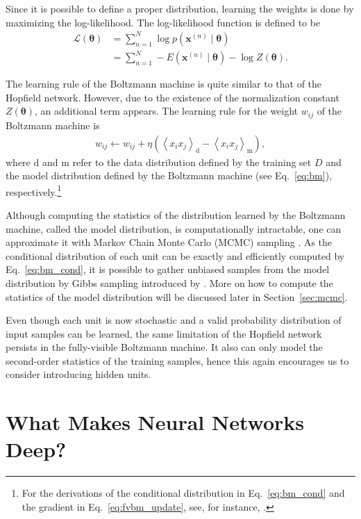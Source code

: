 \documentclass[dissertation,nocontribution]{aaltoseries}
\newcommand{\vect}[1]{\mathbf{#1}}
\newcommand{\vects}[1]{\boldsymbol{#1}}
\newcommand{\vx}[0]{\vect{x}}
\newcommand{\td}[0]{\text{d}}
\newcommand{\tf}[0]{\text{m}}
\newcommand{\TT}[0]{{\vects{\theta}}}
\newcommand{\LL}[0]{\mathcal{L}}
\begin{document}
Since it is possible to define a proper distribution,
learning the weights is done by maximizing the
log-likelihood. The log-likelihood function is defined to be
\begin{align}
    \label{eq:fvbm_ll}
    \LL(\TT) &= \sum_{n=1}^N \log p(\vx^{(n)} \mid \TT) 
    \nonumber
    \\
    &= \sum_{n=1}^N -E\left( \vx^{(n)} \mid \TT \right) -
    \log Z(\TT).
\end{align}

The learning rule of the Boltzmann machine is quite similar
to that of the Hopfield network. However, due to the
existence of the normalization constant $Z(\TT)$, an
additional term appears. The learning rule for the weight
$w_{ij}$ of the Boltzmann machine is
\begin{align}
    \label{eq:fvbm_update}
    w_{ij} \leftarrow w_{ij} + \eta \left( \left< x_i
    x_j\right>_\td - \left< x_i x_j \right>_\tf \right),
\end{align}
where $\td$ and $\tf$ refer to the data distribution defined
by the training set $D$ and the model distribution defined
by the Boltzmann machine (see Eq.~\eqref{eq:bm}),
respectively.\footnote{
For the derivations of the conditional distribution in
Eq.~\eqref{eq:bm_cond} and the gradient in
Eq.~\eqref{eq:fvbm_update}, see, for instance,
\citep{Cho2011t}.
}

Although computing the statistics of the distribution
learned by the Boltzmann machine, called the model distribution,
is computationally intractable, one can approximate it with
Markov Chain Monte Carlo (MCMC) sampling \citep[see,
e.g.,][]{Neal1993}.
As the conditional distribution of each unit can be exactly
and efficiently computed by Eq.~\eqref{eq:bm_cond}, it is
possible to gather unbiased samples from the model
distribution by Gibbs sampling introduced by
\citet{Geman1984}. More on how to compute the statistics of
the model distribution will be discussed later in
Section~\ref{sec:mcmc}.

Even though each unit is now stochastic and a valid probability
distribution of input samples can be learned, the same limitation
of the Hopfield network persists in the fully-visible Boltzmann
machine. It also can only model the second-order statistics of
the training samples, hence this again encourages us to consider
introducing hidden units.

\section{What Makes Neural Networks Deep?}
\label{sec:deep_conditions}
\end{document}
